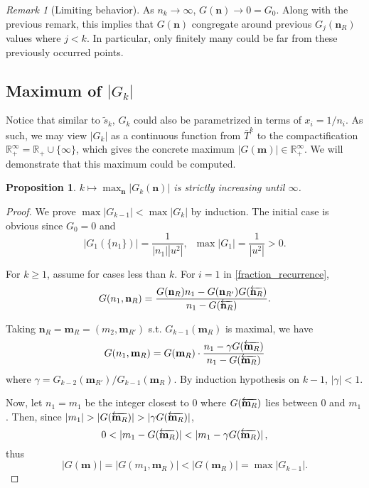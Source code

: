 \documentclass{article}
\theoremstyle{definition}
\theoremstyle{plain}
\newtheorem{proposition}{Proposition}[section]
\theoremstyle{remark}
\newtheorem*{remark}{Remark}
\numberwithin{equation}{section}
\newcommand{\real}{\mathbb{R}}
\newcommand{\abs}[1]{\left\lvert{#1}\right\rvert}
\begin{document}
\begin{remark}[Limiting behavior]
  As $n_k \to \infty$, $G(\mathbf{n}) \to 0 = G_0$.
  Along with the previous remark,
  this implies that $G(\mathbf{n})$ congregate around previous $G_{j}(\mathbf{n}_R)$ values where $j < k$.
  In particular, only finitely many could be far from these previously occurred points.
\end{remark}

\subsection{Maximum of $\abs{G_k}$}

Notice that similar to $\tilde{s}_k$,
$G_k$ could also be parametrized in terms of $x_i = 1 / n_i$.
As such, we may view $\abs{G_k}$ as a continuous function
from $\bar{T}^{k}$ to the compactification $\real_{+}^\infty = \real_{+} \cup \{ \infty \}$,
which gives the concrete maximum $\abs{G(\mathbf{m})} \in \real_{+}^\infty$.
We will demonstrate that this maximum could be computed.

\begin{proposition}\label{fraction_max_increase}
  $k \mapsto \max_{\mathbf{n}} \abs{G_k(\mathbf{n})}$ is strictly increasing until $\infty$.
\end{proposition}
\begin{proof}
  We prove $\max \abs{G_{k-1}} < \max \abs{G_{k}}$ by induction.
  The initial case is obvious since $G_0 = 0$ and
  \[ \abs{G_1(\{n_1\})} = \frac{1}{\abs{n_1} \abs{u^2}}, \;\; \max \abs{G_1} = \frac{1}{\abs{u^2}} > 0. \]

  For $k \geq 1$, assume for cases less than $k$.
  For $i = 1$ in \ref{fraction_recurrence},
  \[
    G(n_1, \mathbf{n}_R)
    = \frac{G(\mathbf{n}_R) n_1 - G(\mathbf{n}_{R'}) G(\overleftarrow{\mathbf{n}_R})}{n_1 - G(\overleftarrow{\mathbf{n}_R})}.
  \]

  Taking $\mathbf{n}_R = \mathbf{m}_R = (m_2, \mathbf{m}_{R'})$ s.t. $G_{k-1}(\mathbf{m}_R)$ is maximal, we have
  \[
    G(n_1, \mathbf{m}_R) = G(\mathbf{m}_R) \cdot \frac{n_1 - \gamma G(\overleftarrow{\mathbf{m}_R})}{n_1 - G(\overleftarrow{\mathbf{m}_R})}
  \]
  where $\gamma = G_{k-2}(\mathbf{m}_{R'}) / G_{k-1}(\mathbf{m}_R)$.
  By induction hypothesis on $k-1$, $\abs{\gamma} < 1$.

  Now, let $n_1 = m_1$ be the integer closest to $0$ where $G(\overleftarrow{\mathbf{m}_R})$ lies between $0$ and $m_1$.
  Then, since $\abs{m_1} > \abs{G(\rev{\mathbf{m}_R})} > \abs{\gamma G(\rev{\mathbf{m}_R})}$,
  \[
    0 < \abs{m_1 - G(\rev{\mathbf{m}_R})} < \abs{m_1 - \gamma  G(\rev{\mathbf{m}_R})},
  \]
  thus
  \[
    \abs{G(\mathbf{m})} = \abs{G(m_1, \mathbf{m}_R)} < \abs{G(\mathbf{m}_R)} = \max \abs{G_{k-1}}.
  \]
\end{proof}
\end{document}
